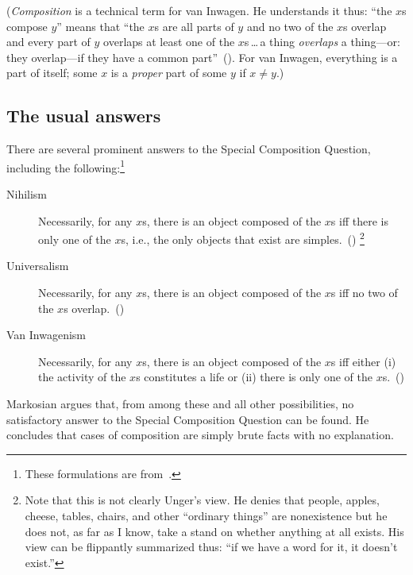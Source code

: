 \documentclass[11pt]{article}
\begin{document}
\begin{spacing}{1.5}
({\em Composition} is a technical term for van Inwagen. He understands it thus: ``the $x$s compose $y$'' means that ``the $x$s are all parts of $y$ and no two of the $x$s overlap and every part of $y$ overlaps at least one of the $x$s\,\ldots\,a thing {\em overlaps} a thing---or: they overlap---if they have a common part''~(\citeyear[29]{inwagen1995}). For van Inwagen, everything is a part of itself; some $x$ is a {\em proper} part of some $y$ if $x \neq y$.)

\subsection{The usual answers}
There are several prominent answers to the Special Composition Question, including the following:\footnote{These formulations are from~\citet{markosian1998a}.}
\begin{description}
	\item[Nihilism] Necessarily, for any $x$s, there is an object composed of the $x$s iff there is only one of the $x$s, i.e., the only objects that exist are simples.~(\citeyear[219]{markosian1998a})%
	\footnote{\label{flip} Note that this is not clearly Unger's view. He denies that people, apples, cheese, tables, chairs, and other ``ordinary things'' are nonexistence but he does not, as far as I know, take a stand on whether anything at all exists. His view can be flippantly summarized thus: ``if we have a word for it, it doesn't exist.''}
	\item[Universalism] Necessarily, for any $x$s, there is an object composed of the $x$s iff no two of the $x$s overlap.~(\citeyear[227]{markosian1998a})
	\item[Van Inwagenism] Necessarily, for any $x$s, there is an object composed of the $x$s iff either (i) the activity of the $x$s constitutes a life or (ii) there is only one of the $x$s.~(\citeyear[221]{markosian1998a})
\end{description}

Markosian argues that, from among these and all other possibilities, no satisfactory answer to the Special Composition Question can be found. He concludes that cases of composition are simply brute facts with no explanation.%


\end{spacing}
\end{document}

